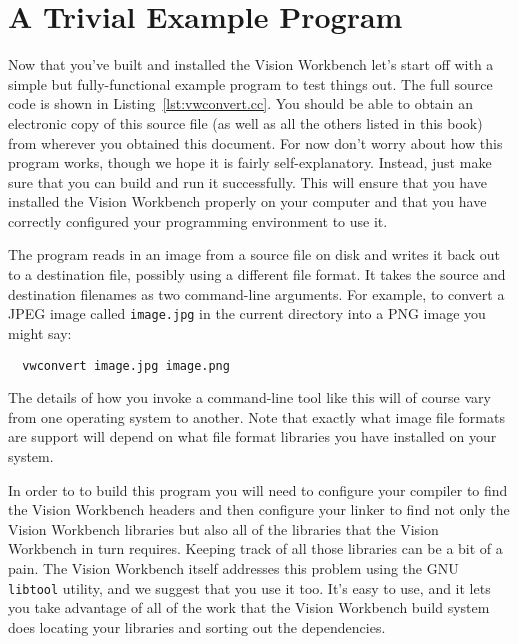 \section{A Trivial Example Program}

Now that you've built and installed the Vision Workbench let's start
off with a simple but fully-functional example program to test things
out.  The full source code is shown in Listing~\ref{lst:vwconvert.cc}.
You should be able to obtain an electronic copy of this source file
(as well as all the others listed in this book) from wherever you
obtained this document.  For now don't worry about how this program
works, though we hope it is fairly self-explanatory.  Instead, just
make sure that you can build and run it successfully.  This will
ensure that you have installed the Vision Workbench properly on your
computer and that you have correctly configured your programming
environment to use it.


The program reads in an image from a source file on disk and writes it 
back out to a destination file, possibly using a different file format.  
It takes the source and destination filenames as two command-line arguments.  
For example, to convert a JPEG image called \verb#image.jpg# in the current 
directory into a PNG image you might say:
\begin{verbatim}
  vwconvert image.jpg image.png
\end{verbatim}
The details of how you invoke a command-line tool like this will of 
course vary from one operating system to another.  Note that exactly 
what image file formats are support will depend on what file format 
libraries you have installed on your system.

In order to to build this program you will need to configure your 
compiler to find the Vision Workbench headers and then configure 
your linker to find not only the Vision Workbench libraries but 
also all of the libraries that the Vision Workbench in turn 
requires.  Keeping track of all those libraries can be a bit of 
a pain.  The Vision Workbench itself addresses this problem using 
the GNU \verb#libtool# utility, and we suggest that you use it 
too.  It's easy to use, and it lets you take advantage of all of 
the work that the Vision Workbench build system does locating your 
libraries and sorting out the dependencies.

